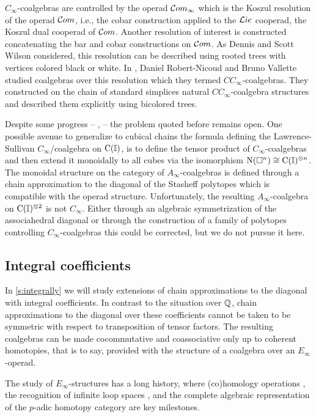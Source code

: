 $C_\infty$-coalgebras are controlled by the operad $\mathcal{C}om_\infty$ which is the Koszul resolution of the operad $\mathcal{C}om$, i.e., the cobar construction applied to the $\mathcal{L}ie$ cooperad, the Koszul dual cooperad of $\mathcal{C}om$.
Another resolution of interest is constructed concatenating the bar and cobar constructions on $\mathcal{C}om$.
As Dennis and Scott Wilson considered, this resolution can be described using rooted trees with vertices colored black or white.
In \cite{vallette2020higherlietheory}, Daniel Robert-Nicoud and Bruno Vallette studied coalgebras over this resolution which they termed $CC_\infty$-coalgebras.
They constructed on the chain of standard simplices natural $CC_\infty$-coalgebra structures and described them explicitly using bicolored trees.

Despite some progress -- \cite{lawrence2019triangle, lawrence2021cells}, \cite[\S6.5]{buijs2020liemodels} -- the problem quoted before remains open.
One possible avenue to generalize to cubical chains the formula defining the Lawrence-Sullivan $C_\infty$\-/coalgebra on $\operatorname{C}(\mathbb{I})$, is to define the tensor product of $C_\infty$-coalgebras and then extend it monoidally to all cubes via the isomorphism $\operatorname{N}(\square^n) \cong \operatorname{C}(\mathbb{I})^{\otimes n}$.
The monoidal structure on the category of $A_\infty$-coalgebras is defined through a chain approximation to the diagonal of the Stasheff polytopes which is compatible with the operad structure.
Unfortunately, the resulting $A_\infty$-coalgebra on $\operatorname{C}(\mathbb{I})^{\otimes 2}$ is not $C_\infty$.
Either through an algebraic symmetrization of the associahedral diagonal or through the construction of a family of polytopes controlling $C_\infty$-coalgebras this could be corrected, but we do not pursue it here.

\subsection*{Integral coefficients}

In \cref{s:integrally} we will study extensions of chain approximations to the diagonal with integral coefficients.
In contrast to the situation over $\mathbb{Q}$, chain approximations to the diagonal over these coefficients cannot be taken to be symmetric with respect to transposition of tensor factors.
The resulting coalgebras can be made cocommutative and coassociative only up to coherent homotopies, that is to say, provided with the structure of a coalgebra over an $E_\infty$-operad.

The study of $E_\infty$-structures has a long history, where (co)homology operations \cite{steenrod1962cohomology, may1970general}, the recognition of infinite loop spaces \cite{boardman1973homotopy, may1972geometry}, and the complete algebraic representation of the $p$-adic homotopy category \cite{mandell2001padic} are key milestones.

